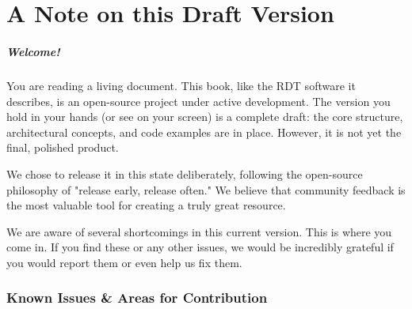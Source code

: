 \newpage
\chapter*{A Note on this Draft Version}

\paragraph{Welcome!}

You are reading a living document. This book, like the RDT software it describes, is an open-source project under active development. The version you hold in your hands (or see on your screen) is a complete draft: the core structure, architectural concepts, and code examples are in place. However, it is not yet the final, polished product.

We chose to release it in this state deliberately, following the open-source philosophy of "release early, release often." We believe that community feedback is the most valuable tool for creating a truly great resource.

We are aware of several shortcomings in this current version. This is where you come in. If you find these or any other issues, we would be incredibly grateful if you would report them or even help us fix them.

\vspace{2ex}
\subsection*{Known Issues \& Areas for Contribution}

